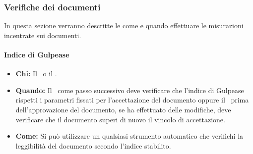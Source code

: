 \subsubsection{Verifiche dei documenti}
In questa sezione verranno descritte le come e quando effettuare le misurazioni incentrate sui documenti.

\paragraph{Indice di Gulpease}
\begin{itemize}
\item \textbf{Chi:} Il \Ver\ o il \Pm.
\item \textbf{Quando:} Il \Ver\ come passo successivo deve verificare che l'indice di Gulpease rispetti i parametri fissati per l'accettazione del documento oppure il \Pm\ prima dell'approvazione del documento, se ha effettuato delle modifiche, deve verificare che il documento superi di nuovo il vincolo di accettazione.
\item \textbf{Come:} Si può utilizzare un qualsiasi strumento automatico che verifichi la leggibilità del documento secondo l'indice stabilito.
\end{itemize}
